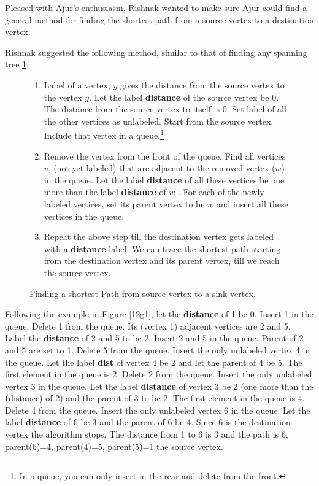 Pleased with Ajur's enthusiasm, Rishnak wanted to make sure Ajur could find a general method for finding the shortest path from a source vertex to a destination vertex.

Rishnak suggested the following method, similar to that of finding any spanning tree \ref{12a1}.

\begin{figure} 
\begin{enumerate}
\item  Label of a vertex, $y$ gives the distance from the source vertex to the vertex $y$.  Let the label \textbf{distance} of the source vertex be 0. The distance from the source vertex to itself is 0. Set label of all the other vertices as unlabeled. Start from the source vertex. Include that vertex in a queue.\footnote{ In a queue, you can only insert in the rear and delete from the front.} 
\item Remove the vertex from the front of the queue. Find all vertices $v$, (not yet labeled) that are adjacent to the removed vertex ($w$) in the queue. Let the label \textbf{distance} of all these vertices be one more than the label \textbf{distance} of $w$ . For each of the newly labeled vertices, set its parent vertex to be $w$ and insert all these vertices in the queue.
\item Repeat the above step till the destination vertex gets labeled with a \textbf{distance} label. We can trace the shortest path starting from the destination vertex and its parent vertex, till we reach the source vertex.
\end{enumerate}
\caption{Finding a shortest Path from source vertex to a sink vertex.}\label{12a1}
\end{figure}

Following the example in Figure \ref{12g1}, let the \textbf{distance} of 1 be 0. Insert 1 in the queue. Delete 1 from the queue. Its (vertex 1) adjacent vertices are 2 and 5. Label the \textbf{distance} of 2 and 5 to be 2. Insert 2 and 5 in the queue. Parent of 2 and 5 are set  to 1. Delete 5 from the queue. Insert the only unlabeled vertex 4 in the queue. Let the label \textbf{dist} of vertex 4 be 2 and let the parent of 4 be 5. The first element in the queue is 2. Delete 2 from the queue. Insert the only unlabeled vertex 3 in the queue.  Let the label \textbf{distance} of vertex 3 be 2 (one more than the \textbf(distance) of 2) and the parent of 3 to be 2. The first element in the queue is 4. Delete 4 from the queue. Insert the only unlabeled vertex 6 in the queue. Let the label \textbf{distance} of 6 be 3 and the parent of 6 be 4. Since 6 is the destination vertex the algorithm stops. The distance from 1 to 6 is 3 and the path is 6, parent(6)=4, parent(4)=5, parent(5)=1 the source vertex.

